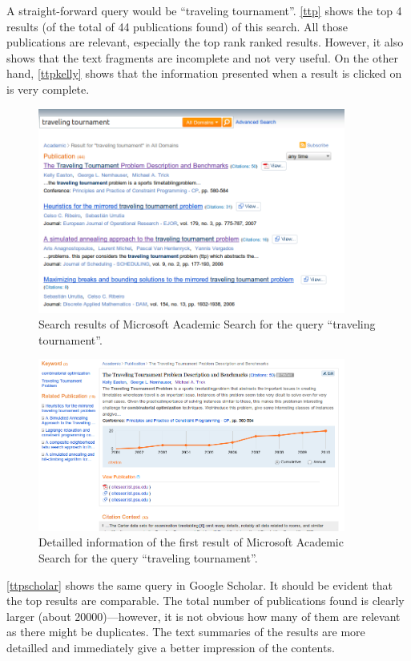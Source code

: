 \documentclass[12pt]{article}
\begin{document}
A straight-forward query would be ``traveling tournament''. \autoref{ttp} shows the top 4 results (of the total of 44 publications found) of this search. All those publications are relevant, especially the top rank ranked results. However, it also shows that the text fragments are incomplete and not very useful. On the other hand, \autoref{ttpkelly} shows that the information presented when a result is clicked on is very complete.

\begin{figure}[hbpt]
 \centering
 \includegraphics[width=0.9\textwidth]{ttp}
 \caption{Search results of Microsoft Academic Search for the query ``traveling tournament''.}
 \label{ttp}
\end{figure}

\begin{figure}[hbpt]
 \centering
 \includegraphics[width=0.9\textwidth]{ttpkelly}
 \caption{Detailled information of the first result of Microsoft Academic Search for the query ``traveling tournament''.}
 \label{ttpkelly}
\end{figure}

\autoref{ttpscholar} shows the same query in Google Scholar. It should be evident that the top results are comparable. The total number of publications found is clearly larger (about 20000)---however, it is not obvious how many of them are relevant as there might be duplicates.
The text summaries of the results are more detailled and immediately give a better impression of the contents.
\end{document}
